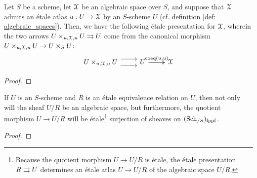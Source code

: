             \begin{proposition} \label{prop: existence_of_etale_presentations_of_algebraic_spaces}
                Let $S$ be a scheme, let $\mathcal{X}$ be an algebraic space over $S$, and suppose that $\mathcal{X}$ admits an \'etale atlas $u: U \to \mathcal{X}$ by an $S$-scheme $U$ (cf. definition \ref{def: algebraic_spaces}). Then, we have the following \'etale presentation for $\mathcal{X}$, wherein the two arrows $U \x_{u, \calX, u} U \toto U$ come from the canonical morphism $U \x_{u, \calX, u} U \to U \x_S U$:
                    $$
                        \begin{tikzcd}
                        	{U \x_{u, \calX, u} U} & U & \calX
                        	\arrow[shift right=2, from=1-1, to=1-2]
                        	\arrow[shift left=2, from=1-1, to=1-2]
                        	\arrow["{\coeq(u, u)}", two heads, from=1-2, to=1-3]
                        \end{tikzcd}
                    $$ 
            \end{proposition}
                \begin{proof}
                    
                \end{proof}
            \begin{proposition} \label{prop: quotients_of_schemes_by_etale_equivalence_relations_are_algebraic_spaces}
                If $U$ is an $S$-scheme and $R$ is an \'etale equivalence relation on $U$, then not only will the sheaf $U/R$ be an algebraic space, but furthermore, the quotient morphism $U \to U/R$ will be \'etale\footnote{Because the quotient morphism $U \to U/R$ is \'etale, the \'etale presentation $R \rightrightarrows U$ determines an \'etale atlas $U \to U/R$ of the algebraic space $U/R$.} surjection of sheaves on $(\mathrm{Sch}_{/S})_{\mathrm{fppf}}$. 
            \end{proposition}
                \begin{proof}
                    
                \end{proof}
                
            \begin{proposition} \label{prop: puhsouts_of_algebraic_spaces}
                
            \end{proposition}
    
